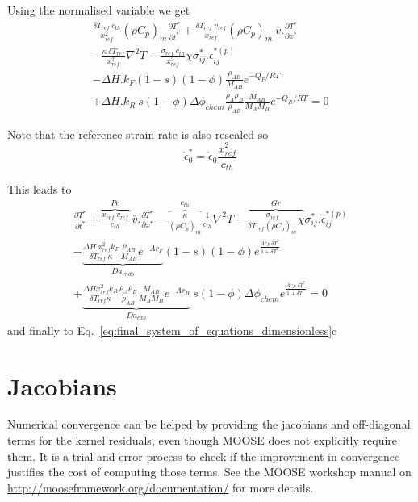 \documentclass[]{scrreprt}
\newcommand{\moose}{{MOOSE}}
\begin{document}
Using the normalised variable we get
\begin{multline}
  \label{eq:energy_balance1}
  \frac{\delta T_{ref}\:c_{th}}{x^2_{ref}}(\rho C_p)_m \frac{\partial T^*}{\partial t^*} + \frac{\delta T_{ref}\:v_{ref}}{x_{ref}}(\rho C_p)_m \:\bar{v}.\frac{\partial T^*}{\partial x^*} \\ 
  - \frac{\kappa\:\delta T_{ref}}{x^2_{ref}} \nabla^2 T - \frac{\sigma_{ref}\:c_{th}}{x^2_{ref}} \chi \sigma^*_{ij}.\dot{\epsilon}^{*(p)}_{ij} \\
  - \Delta H.k_F (1 - s)(1 - \phi)\frac{\rho_{AB}}{M_{AB}}  e^{-Q_F/RT} \\
  + \Delta H. k_R \:s  (1 - \phi)  \Delta \phi_{chem} \frac{\rho_{A} \rho_{B}}{\rho_{AB}} \frac{M_{AB}}{M_A M_B}  e^{-Q_R/RT} = 0
\end{multline}

Note that the reference strain rate is also rescaled so 
\begin{equation}
  \dot{\epsilon}^*_0 = \dot{\epsilon}_0 \frac{x^2_{ref}}{c_{th}}
\end{equation}

This leads to 
\begin{multline}
  \label{eq:energy_balance2}
  \frac{\partial T^*}{\partial t^*} + \overbrace{\frac{x_{ref}\:v_{ref}}{c_{th}}}^{Pe}\:\bar{v}.\frac{\partial T^*}{\partial x^*} - \overbrace{\frac{\kappa}{(\rho C_p)_m}}^{c_{th}}\frac{1}{c_{th}} \nabla^2 T - \overbrace{\frac{\sigma_{ref}}{\delta T_{ref}(\rho C_p)_m} \chi}^{Gr} \sigma^*_{ij}.\dot{\epsilon}^{*(p)}_{ij} \\
  - \underbrace{\frac{\Delta H\:x^2_{ref} k_F }{\delta T_{ref}\:\kappa}\frac{\rho_{AB}}{M_{AB}}e^{-Ar_F}}_{Da_{endo}} (1 - s)(1 - \phi)e^{\frac{Ar_F\:\delta T^*}{1+\delta T^*}} \\
   + \underbrace{\frac{\Delta H x^2_{ref} k_R}{\delta T_{ref}\kappa} \frac{\rho_{A} \rho_{B}}{\rho_{AB}} \frac{M_{AB}}{M_A M_B} e^{-Ar_R}}_{Da_{exo}}\:s  (1 - \phi)\Delta \phi_{chem} e^{\frac{Ar_R\:\delta T^*}{1+\delta T^*}}= 0
\end{multline}
and finally to Eq.~\ref{eq:final_system_of_equations_dimensionless}c

\section{Jacobians}
Numerical convergence can be helped by providing the jacobians and off-diagonal terms for the kernel residuals, even though \moose{} does not explicitly require them. It is a trial-and-error process to check if the improvement in convergence justifies the cost of computing those terms. See the \moose{} workshop manual on \url{http://mooseframework.org/documentation/} for more details.
\end{document}
